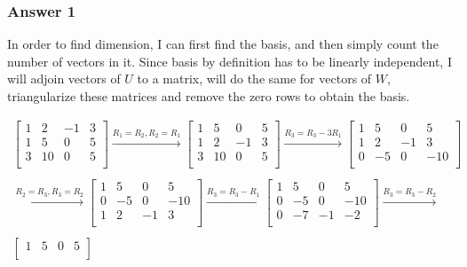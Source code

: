 \documentclass[fleqn]{article}
\begin{document}
\subsubsection{Answer 1}
\label{sec-1-1-1}
In order to find dimension, I can first find the basis, and then simply
count the number of vectors in it.  Since basis by definition has to be
linearly independent, I will adjoin vectors of $U$ to a matrix, will do
the same for vectors of $W$, triangularize these matrices and remove the
zero rows to obtain the basis.

\begin{multline*}
  \begin{bmatrix}
    1 & 2  & -1 & 3 \\
    1 & 5  & 0  & 5 \\
    3 & 10 & 0  & 5 \\
  \end{bmatrix}
  \xrightarrow{R_1 = R_2, R_2 = R_1}
  \begin{bmatrix}
    1 & 5  & 0  & 5 \\
    1 & 2  & -1 & 3 \\
    3 & 10 & 0  & 5 \\
  \end{bmatrix}
  \xrightarrow{R_3 = R_3 - 3R_1}
  \begin{bmatrix}
    1 & 5  & 0  & 5 \\
    1 & 2  & -1 & 3 \\
    0 & -5 & 0  & -10 \\
  \end{bmatrix} \\ \\
  \xrightarrow{R_2 = R_3, R_3 = R_2}
  \begin{bmatrix}
    1 & 5  & 0  & 5 \\
    0 & -5 & 0  & -10 \\
    1 & 2  & -1 & 3 \\
  \end{bmatrix}
  \xrightarrow{R_3 = R_3 - R_1}
  \begin{bmatrix}
    1 & 5  & 0  & 5 \\
    0 & -5 & 0  & -10 \\
    0 & -7  & -1 & -2 \\
  \end{bmatrix}
  \xrightarrow{R_3 = R_3 - R_2} \\ \\
  \begin{bmatrix}
    1 & 5  & 0  & 5 \\

\end{bmatrix}
\end{multline*}
\end{document}
